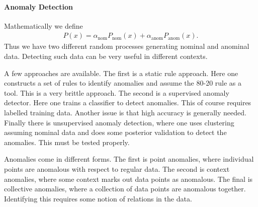 \paragraph{Anomaly Detection}
Mathematically we define
\begin{align*}
	P(x) = \alpha_{\text{nom}}P_{\text{nom}}(x) + \alpha_{\text{anom}}P_{\text{anom}}(x).
\end{align*}
Thus we have two different random processes generating nominal and anominal data. Detecting such data can be very useful in different contexts.

A few approaches are available. The first is a static rule approach. Here one constructs a set of rules to identify anomalies and assume the 80-20 rule as a tool.  This is a very brittle approach. The second is a supervised anomaly detector. Here one trains a classifier to detect anomalies. This of course requires labelled training data. Another issue is that high accuracy is generally needed. Finally there is unsupervised anomaly detection, where one uses clustering assuming nominal data and does some posterior validation to detect the anomalies. This must be tested properly.

Anomalies come in different forms. The first is point anomalies, where individual points are anomalous with respect to regular data. The second is context anomalies, where some context marks out data points as anomalous. The final is collective anomalies, where a collection of data points are anomalous together. Identifying this requires some notion of relations in the data.